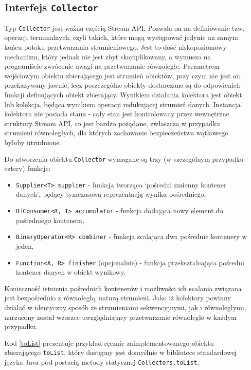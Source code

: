\documentclass[12pt,twoside,openright]{extarticle}
\begin{document}
\subsection{Interfejs \texttt{Collector}}

    Typ \texttt{Collector} jest ważną częścią Stream API. Pozwala on na definiowanie tzw. operacji terminalnych, czyli takich, które mogą występować jedynie na samym końcu potoku przetwarzania strumieniowego. Jest to dość niskopoziomowy mechanizm, który jednak nie jest zbyt skomplikowany, a wymusza na programiście zwrócenie uwagi na przetwarzanie równoległe. Parametrem wejściowym obiektu zbierającego jest strumień obiektów, przy czym nie jest on przekazywany jawnie, lecz poszczególne obiekty dostarczane są do odpowienich funkcji definujących obiekt zbierający. Wynikiem działania kolektora jest obiekt lub kolekcja, będąca wynikiem operacji redukującej strumień danych. Instancja kolektora nie posiada stanu - cały stan jest kontrolowany przez wewnętrzne struktury Stream API, co jest bardzo pożądane, zwłaszcza w przypadku strumieni równoległych, dla których zachowanie bezpieczeństwa wątkowego byłoby utrudnione.

    Do utworzenia obiektu \texttt{Collector} wymagane są trzy (w szczególnym przypadku cztery) funkcje:

\begin{itemize}
    \item \texttt{Supplier<T> supplier} - funkcja tworząca `pośredni zmienny kontener danych', będący tymczasową reprezentacją wyniku pośredniego,
    \item \texttt{BiConsumer<R, T> accumulator} - funkcja dodająca nowy element do pośredniego kontenera,
    \item \texttt{BinaryOperator<R> combiner} - funkcja scalająca dwa pośrednie kontenery w jeden,
    \item \texttt{Function<A, R> finisher} (opcjonalnie) - funkcja przekształcająca pośredni kontener danych w obiekt wynikowy.
\end{itemize}

    Konieczność istnienia pośrednich kontenerów i możliwości ich scalania związana jest bezpośrednio z równoległą naturą strumieni. Jako iż kolektory powinny działać w identyczny sposób ze strumieniami sekwencyjnymi, jak i równoległymi, narzucony został wzorzec uwzględniający przetwarzanie równoległe w każdym przypadku.

    Kod \ref{toList} prezentuje przykład ręcznie zaimplementowanego obiektu zbierającego \texttt{toList}, który dostępny jest domyślnie w bibliotece standardowej języka Java pod postacią metody statycznej \texttt{Collectors.toList}.
\end{document}
